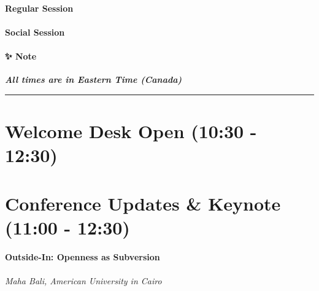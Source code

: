 \documentclass[
]{book}
\begin{document}
\begin{secondary}
\hypertarget{regular-session}{%
\paragraph{Regular Session}\label{regular-session}}
\end{secondary}
\begin{gh}
\hypertarget{social-session}{%
\paragraph{Social Session}\label{social-session}}
\end{gh}

\begin{protip}
\hypertarget{note}{%
\paragraph*{✨ Note}\label{note}}

\textbf{\emph{All times are in Eastern Time (Canada)}}
\end{protip}

\begin{center}\rule{0.5\linewidth}{0.5pt}\end{center}

\hypertarget{welcome-desk-open-1030---1230-2}{%
\section*{Welcome Desk Open (10:30 - 12:30)}\label{welcome-desk-open-1030---1230-2}}

\hypertarget{conference-updates-keynote-1100---1230-1}{%
\section*{Conference Updates \& Keynote (11:00 - 12:30)}\label{conference-updates-keynote-1100---1230-1}}

\begin{reflect}
\hypertarget{outside-in-openness-as-subversion}{%
\paragraph{Outside-In: Openness as
Subversion}\label{outside-in-openness-as-subversion}}

\emph{Maha Bali, American University in Cairo}
\end{reflect}
\end{document}
